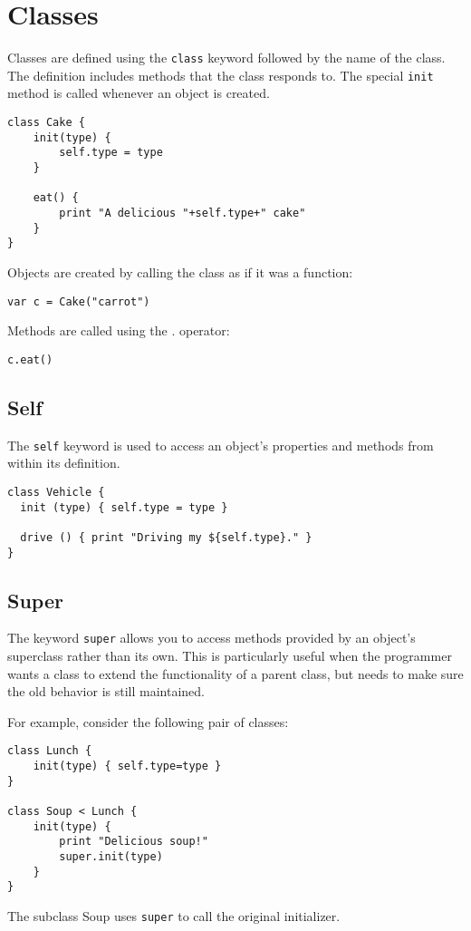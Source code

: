 \hypertarget{classes}{%
\section{Classes}\label{classes}}

Classes are defined using the \texttt{class} keyword followed by the
name of the class. The definition includes methods that the class
responds to. The special \texttt{init} method is called whenever an
object is created.

\begin{lstlisting}
class Cake {
    init(type) {
        self.type = type
    }

    eat() {
        print "A delicious "+self.type+" cake"
    }
}
\end{lstlisting}

Objects are created by calling the class as if it was a function:

\begin{lstlisting}
var c = Cake("carrot")
\end{lstlisting}

Methods are called using the . operator:

\begin{lstlisting}
c.eat()
\end{lstlisting}

\hypertarget{self}{%
\subsection{Self}\label{self}}

The \texttt{self} keyword is used to access an object's properties and
methods from within its definition.

\begin{lstlisting}
class Vehicle {
  init (type) { self.type = type }

  drive () { print "Driving my ${self.type}." }
}
\end{lstlisting}

\hypertarget{super}{%
\subsection{Super}\label{super}}

The keyword \texttt{super} allows you to access methods provided by an
object's superclass rather than its own. This is particularly useful
when the programmer wants a class to extend the functionality of a
parent class, but needs to make sure the old behavior is still
maintained.

For example, consider the following pair of classes:

\begin{lstlisting}
class Lunch {
    init(type) { self.type=type }
}

class Soup < Lunch {
    init(type) {
        print "Delicious soup!"
        super.init(type)
    }
}
\end{lstlisting}

The subclass Soup uses \texttt{super} to call the original initializer.
